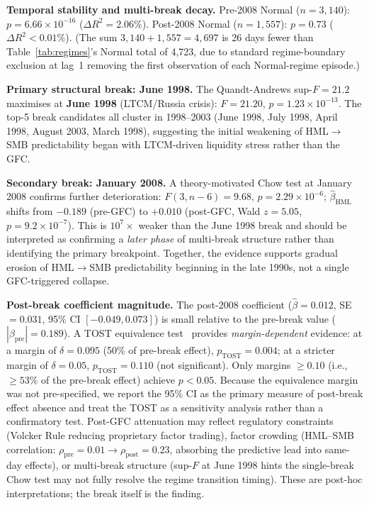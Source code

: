 \documentclass[sigconf,anonymous]{acmart}
\begin{document}
\textbf{Temporal stability and multi-break decay.}
Pre-2008 Normal ($n = 3{,}140$): $p = 6.66 \times 10^{-16}$ ($\Delta R^2 = 2.06\%$).
Post-2008 Normal ($n = 1{,}557$): $p = 0.73$ ($\Delta R^2 < 0.01\%$).
(The sum $3{,}140 + 1{,}557 = 4{,}697$ is 26 days fewer than Table~\ref{tab:regimes}'s
Normal total of 4{,}723, due to standard regime-boundary exclusion at lag~1
removing the first observation of each Normal-regime episode.)

\textbf{Primary structural break: June 1998.}
The Quandt-Andrews sup-$F = 21.2$ maximises at \textbf{June 1998} (LTCM/Russia crisis):
$F = 21.20$, $p = 1.23 \times 10^{-13}$.
The top-5 break candidates all cluster in 1998--2003
(June 1998, July 1998, April 1998, August 2003, March 1998),
suggesting the initial weakening of HML$\to$SMB predictability began with
LTCM-driven liquidity stress rather than the GFC.

\textbf{Secondary break: January 2008.}
A theory-motivated Chow test at January 2008 confirms further deterioration:
$F(3,n{-}6) = 9.68$, $p = 2.29 \times 10^{-6}$; $\hat{\beta}_{\text{HML}}$ shifts
from $-0.189$ (pre-GFC) to $+0.010$ (post-GFC, Wald $z = 5.05$, $p = 9.2 \times 10^{-7}$).
This is $10^{7}\times$ weaker than the June 1998 break and should be interpreted as
confirming a \emph{later phase} of multi-break structure rather than identifying the
primary breakpoint. Together, the evidence supports gradual erosion of HML$\to$SMB
predictability beginning in the late 1990s, not a single GFC-triggered collapse.

\textbf{Post-break coefficient magnitude.}
The post-2008 coefficient ($\hat{\beta} = 0.012$, SE $= 0.031$, 95\% CI $[-0.049, 0.073]$)
is small relative to the pre-break value ($|\beta_{\text{pre}}| = 0.189$).
A TOST equivalence test~\cite{schuirmann1987comparison} provides
\emph{margin-dependent} evidence: at a margin of $\delta = 0.095$ (50\% of
pre-break effect), $p_{\text{TOST}} = 0.004$; at a stricter margin of
$\delta = 0.05$, $p_{\text{TOST}} = 0.110$ (not significant).
Only margins $\geq 0.10$ (i.e., $\geq 53\%$ of the pre-break effect) achieve $p < 0.05$.
Because the equivalence margin was not pre-specified, we report the 95\% CI
as the primary measure of post-break effect absence and treat the TOST as a
sensitivity analysis rather than a confirmatory test.
Post-GFC attenuation may reflect regulatory constraints
(Volcker Rule reducing proprietary factor trading), factor crowding
(HML--SMB correlation: $\rho_{\text{pre}} = 0.01 \to \rho_{\text{post}} = 0.23$,
absorbing the predictive lead into same-day effects), or multi-break
structure (sup-$F$ at June 1998 hints the single-break Chow test
may not fully resolve the regime transition timing).
These are post-hoc interpretations; the break itself is the finding.
\end{document}
